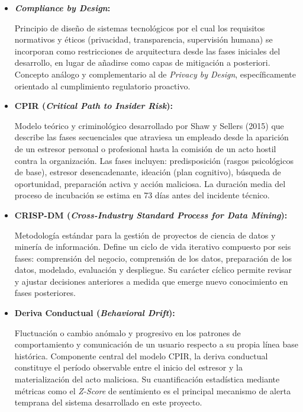 \documentclass[IB]{TFUOC}%
\begin{document}
\begin{itemize}
    \item \textbf{\textit{Compliance by Design}:}
    
    Principio de diseño de sistemas tecnológicos por el cual los requisitos normativos y éticos (privacidad, transparencia, supervisión humana) se incorporan como restricciones de arquitectura desde las fases iniciales del desarrollo, en lugar de añadirse como capas de mitigación a posteriori. Concepto análogo y complementario al de \textit{Privacy by Design}, específicamente orientado al cumplimiento regulatorio proactivo.

    \item \textbf{CPIR (\textit{Critical Path to Insider Risk}):}
    
    Modelo teórico y criminológico desarrollado por Shaw y Sellers (2015) que describe las fases secuenciales que atraviesa un empleado desde la aparición de un estresor personal o profesional hasta la comisión de un acto hostil contra la organización. Las fases incluyen: predisposición (rasgos psicológicos de base), estresor desencadenante, ideación (plan cognitivo), búsqueda de oportunidad, preparación activa y acción maliciosa. La duración media del proceso de incubación se estima en 73 días antes del incidente técnico.

    \item \textbf{CRISP-DM (\textit{Cross-Industry Standard Process for Data Mining}):}
    
    Metodología estándar para la gestión de proyectos de ciencia de datos y minería de información. Define un ciclo de vida iterativo compuesto por seis fases: comprensión del negocio, comprensión de los datos, preparación de los datos, modelado, evaluación y despliegue. Su carácter cíclico permite revisar y ajustar decisiones anteriores a medida que emerge nuevo conocimiento en fases posteriores.

    \item \textbf{Deriva Conductual (\textit{Behavioral Drift}):}
    
    Fluctuación o cambio anómalo y progresivo en los patrones de comportamiento y comunicación de un usuario respecto a su propia línea base histórica. Componente central del modelo CPIR, la deriva conductual constituye el período observable entre el inicio del estresor y la materialización del acto maliciosa. Su cuantificación estadística mediante métricas como el \textit{Z-Score} de sentimiento es el principal mecanismo de alerta temprana del sistema desarrollado en este proyecto.



\end{itemize}
\end{document}
